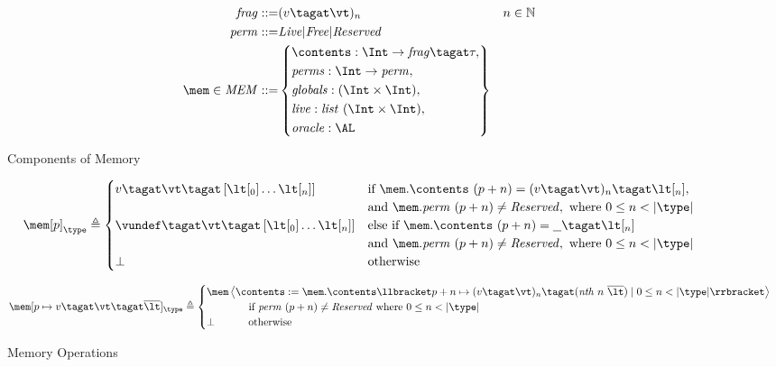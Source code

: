 \documentclass{article}
\begin{document}
\begin{figure}[t]
  \begin{align*}
    \mathit{frag} ::= & (v\tagat\vt)_n & n \in \mathbb{N} \\
    \mathit{perm} ::= & \mathit{Live} | \mathit{Free} | \mathit{Reserved} \\
    \mem \in \mathit{MEM} ::= & \left\{
    \begin{aligned}
      & \contents : \Int \rightarrow \mathit{frag}\tagat \tau, \\
      & \mathit{perms} : \Int \rightarrow \mathit{perm}, \\
      & \mathit{globals} : (\Int \times \Int), \\
      & \mathit{live} : \mathit{list} ~ (\Int \times \Int), \\
      & \mathit{oracle} : \AL
    \end{aligned} \right\} \\
  \end{align*}
 
  \caption{Components of Memory}
  \label{fig:mem}
\end{figure}

\begin{figure}[t]
  \[\mem[p]_{\type} \triangleq
  \begin{cases}
    v\tagat\vt\tagat\left[\lt[_0]\dots\lt[_n]\right] & \textnormal{if } \mem.\contents ~ (p+n) = (v\tagat\vt)_n\tagat\lt[_n], \\
    & \textnormal{and } \mem.\mathit{perm} ~ (p+n) \not = \mathit{Reserved}, \textnormal{ where } 0 \leq n < |\type| \\
    \vundef\tagat\vt\tagat\left[\lt[_0]\dots\lt[_n]\right] & \textnormal{else if } \mem.\contents ~ (p+n) = \underline{~~}\tagat\lt[_n] \\
    & \textnormal{and } \mem.\mathit{perm} ~ (p+n) \not = \mathit{Reserved}, \textnormal{ where } 0 \leq n < |\type| \\
    \bot & \textnormal{otherwise}
  \end{cases}\]

  \[\mem[p \mapsto v\tagat\vt\tagat\overline{\lt}]_{\type} \triangleq
  \begin{cases}
    \mem\left\langle\contents := \mem.\contents\llbracket p + n \mapsto (v\tagat\vt)_n\tagat(\mathit{nth} ~ n ~ \overline{\lt}) \mid 0 \leq n < |\type| \rrbracket \right\rangle \\ \hspace{4em} \textnormal{if } \mathit{perm} ~ (p+n) \not = \mathit{Reserved} \textnormal{ where } 0 \leq n < |\type| \\
    \bot \hspace{3.2em} \textnormal{otherwise} \\
  \end{cases}\]
  
  \caption{Memory Operations}
  \label{fig:memops}
\end{figure}
\end{document}
